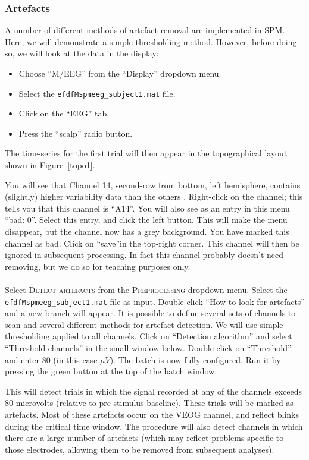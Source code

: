 \subsubsection{Artefacts}
 A number of different methods of artefact removal are implemented in SPM. Here, we will demonstrate a simple thresholding method. However, before doing so, we will look at the data in the display:
\begin{itemize}
\item{Choose ``M/EEG'' from the ``Display'' dropdown menu.}
\item{Select the \texttt{efdfMspmeeg\_subject1.mat} file.}
\item{Click on the ``EEG'' tab.}
\item{Press the ``scalp'' radio button.}
\end{itemize}
The time-series for the first trial will then appear in the topographical layout shown in Figure~\ref{topo1}.

You will see that Channel 14, second-row from bottom, left hemisphere, contains (slightly) higher variability data than the others .
Right-click on the channel; this tells you that this channel is ``A14''. You will also see as an entry in this menu ``bad: 0''. Select this entry, and click the left button. This will make the menu disappear, but the channel now has a grey background. You have marked this channel as bad. Click on ``save''in the top-right corner. This channel will then be ignored in subsequent processing. In fact this channel probably doesn't need removing, but we do so for teaching purposes only.
\\
\\
Select \textsc{Detect artefacts} from the \textsc{Preprocessing} dropdown menu. Select the \texttt{efdfMspmeeg\_subject1.mat} file as input.  Double click ``How to look for artefacts'' and a new branch will appear. It is possible to define several sets of channels to scan and several different methods for artefact detection. We will use simple thresholding applied to all channels. Click on ``Detection algorithm'' and select ``Threshold channels'' in the small window below. Double click on ``Threshold'' and enter 80 (in this case $\mu V$). The batch is now fully configured. Run it by pressing the green button at the top of the batch window.

This will detect trials in which the signal recorded at any of the channels exceeds 80 microvolts (relative to pre-stimulus baseline). These trials will be marked as artefacts. Most of these artefacts occur on the VEOG channel, and reflect blinks during the critical time window. The procedure will also detect channels in which there are a large number of artefacts (which may reflect problems specific to those electrodes, allowing them to be removed from subsequent analyses).

